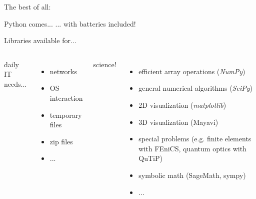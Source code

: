 \begin{frame}{The best of all:}

\begin{exbox}{Python comes...}
	... with \alert{batteries included}!
\end{exbox}

\vspace{-1.25ex}

\begin{center}
	Libraries available for...
\end{center}

\vspace{-4.5ex}

\begin{columns}[t]


\begin{center}
	daily IT needs...
\end{center}

\vspace{-2.5ex}

\begin{itemize}
	\item networks
	\item OS interaction
	\item temporary files
	\item zip files
	\item ...
\end{itemize}


\begin{center}
	\alert{science!}
\end{center}

\vspace{-2.5ex}

\begin{itemize}
	\item efficient array operations (\emph{NumPy})
	\item general numerical algorithms (\emph{SciPy})
	\item 2D visualization (\emph{matplotlib})
	\item 3D visualization (Mayavi)
	\item special problems (e.g. finite elements with FEniCS, quantum optics with QuTiP)
	\item symbolic math (SageMath, sympy)
	\item ...
\end{itemize}

\end{columns}

\end{frame}

